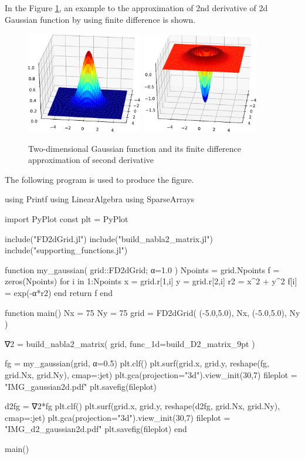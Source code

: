 In the Figure \ref{fig:fd_gaussian_2d}, an example to the approximation of 2nd derivative
of 2d Gaussian function by using finite difference is shown.

\begin{figure}[H]
{\center
\includegraphics[width=0.45\textwidth]{../codes/FD2d/IMG_gaussian2d.pdf}\,%
\includegraphics[width=0.45\textwidth]{../codes/FD2d/IMG_d2_gaussian2d.pdf}
\par}
\caption{Two-dimensional Gaussian function and its finite difference
approximation of second derivative}
\label{fig:fd_gaussian_2d}
\end{figure}

The following program is used to produce the figure.
\begin{juliacode}
using Printf
using LinearAlgebra
using SparseArrays
    
import PyPlot
const plt = PyPlot
    
include("FD2dGrid.jl")
include("build_nabla2_matrix.jl")
include("supporting_functions.jl")
    
function my_gaussian( grid::FD2dGrid; α=1.0 )
  Npoints = grid.Npoints
  f = zeros(Npoints)
  for i in 1:Npoints
    x = grid.r[1,i]
    y = grid.r[2,i]
    r2 = x^2 + y^2
    f[i] = exp(-α*r2)
  end
  return f
end
    
function main()  
  Nx = 75
  Ny = 75
  grid = FD2dGrid( (-5.0,5.0), Nx, (-5.0,5.0), Ny )
    
  ∇2 = build_nabla2_matrix( grid, func_1d=build_D2_matrix_9pt )
    
  fg = my_gaussian(grid, α=0.5)
  plt.clf()
  plt.surf(grid.x, grid.y, reshape(fg, grid.Nx, grid.Ny), cmap=:jet)
  plt.gca(projection="3d").view_init(30,7)
  fileplot = "IMG_gaussian2d.pdf"
  plt.savefig(fileplot)
    
  d2fg = ∇2*fg    
  plt.clf()
  plt.surf(grid.x, grid.y, reshape(d2fg, grid.Nx, grid.Ny), cmap=:jet)
  plt.gca(projection="3d").view_init(30,7)    
  fileplot = "IMG_d2_gaussian2d.pdf"
  plt.savefig(fileplot)
end
    
main()    
\end{juliacode}


